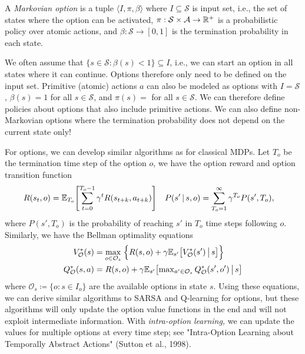 		\begin{definition}
			A \emph{Markovian option} is a tuple \( \langle I, \pi, \beta \rangle \) where \( I \subseteq \mathcal{S} \) is input set, i.e., the set of states where the option can be activated, \( \pi : \mathcal{S} \times \mathcal{A} \to \mathbb{R}^+ \) is a probabilistic policy over atomic actions, and \( \beta : \mathcal{S} \to [0, 1] \) is the termination probability in each state.
		\end{definition}
		We often assume that \( \{ s \in \mathcal{S} : \beta(s) < 1 \} \subseteq I \), i.e., we can start an option in all states where it can continue. Options therefore only need to be defined on the input set. Primitive (atomic) actions \(a\) can also be modeled as options with \(I = \mathcal{S}\), \( \beta(s) = 1 \) for all \(s \in \mathcal{S}\), and \(\pi(s) = \) for all \(s \in \mathcal{S}\). We can therefore define policies about options that also include primitive actions. We can also define non-Markovian options where the termination probability does not depend on the current state only!

		For options, we can develop similar algorithms as for classical \acp{MDP}. Let \(T_o\) be the termination time step of the option \(o\), we have the option reward and option transition function
		\begin{align}
			R(s_t, o)         & = \mathbb{E}_{T_o}\Biggl[ \sum_{t = 0}^{T_o - 1} \gamma^t R(s_{t + k}, a_{t + k}) \Biggr] &
			P(s' \,\vert\, s, o) & = \sum_{T_o = 1}^{\infty} \gamma^{T_o} P(s', T_o),
		\end{align}
		where \(P(s', T_o)\) is the probability of reaching \(s'\) in \(T_o\) time steps following \(o\). Similarly, we have the Bellman optimality equations
		\begin{align}
			V_{\mathcal{O}}^\ast(s)  & = \max_{o \in \mathcal{O}_s} \;\Bigl\{ R(s, o) + \gamma \mathbb{E}_{s'}\bigl[ V_\mathcal{O}^\ast(s') \,\big\vert\, s \bigr] \Bigr\}           \\
			Q_\mathcal{O}^\ast(s, a) & = R(s, o) + \gamma \mathbb{E}_{s'}\bigl[ \textstyle\max_{a' \in \mathcal{O}_s}\displaystyle Q_\mathcal{O}^\ast(s', o') \,\big\vert\, s \bigr]
		\end{align}
		where \( \mathcal{O}_s \coloneqq \{ o : s \in I_o \} \) are the available options in state \(s\). Using these equations, we can derive similar algorithms to \ac{SARSA} and Q-learning for options, but these algorithms will only update the option value functions in the end and will not exploit intermediate information. With \emph{intra-option learning,} we can update the values for multiple options at every time step; see "Intra-Option Learning about Temporally Abstract Actions" (Sutton et al., 1998).

